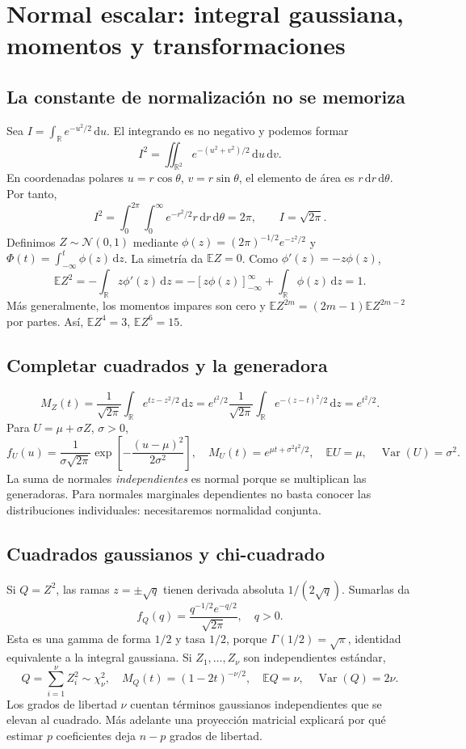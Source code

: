 \documentclass[11pt,a4paper]{article}
\newcommand{\R}{\mathbb R}
\newcommand{\E}{\mathbb E}
\newcommand{\dd}{\,\mathrm d}
\DeclareMathOperator{\Var}{Var}
\theoremstyle{definition}
\begin{document}
\section{Normal escalar: integral gaussiana, momentos y transformaciones}
\subsection{La constante de normalización no se memoriza}
Sea $I=\int_\R e^{-u^2/2}\dd u$. El integrando es no negativo y podemos formar
\[
I^2=\iint_{\R^2}e^{-(u^2+v^2)/2}\dd u\dd v.
\]
En coordenadas polares $u=r\cos\theta$, $v=r\sin\theta$, el elemento de área es $r\dd r\dd\theta$. Por tanto,
\[
I^2=\int_0^{2\pi}\int_0^\infty e^{-r^2/2}r\dd r\dd\theta=2\pi,
\qquad I=\sqrt{2\pi}.
\]
Definimos $Z\sim\mathcal N(0,1)$ mediante $\phi(z)=(2\pi)^{-1/2}e^{-z^2/2}$ y $\Phi(t)=\int_{-\infty}^t\phi(z)\dd z$. La simetría da $\E Z=0$. Como $\phi'(z)=-z\phi(z)$,
\[
\E Z^2=-\int_\R z\phi'(z)\dd z
=-[z\phi(z)]_{-\infty}^{\infty}+\int_\R\phi(z)\dd z=1.
\]
Más generalmente, los momentos impares son cero y $\E Z^{2m}=(2m-1)\E Z^{2m-2}$ por partes. Así, $\E Z^4=3$, $\E Z^6=15$.
\subsection{Completar cuadrados y la generadora}
\[
M_Z(t)=\frac1{\sqrt{2\pi}}\int_\R e^{tz-z^2/2}\dd z
=e^{t^2/2}\frac1{\sqrt{2\pi}}\int_\R e^{-(z-t)^2/2}\dd z=e^{t^2/2}.
\]
Para $U=\mu+\sigma Z$, $\sigma>0$,
\[
f_U(u)=\frac1{\sigma\sqrt{2\pi}}\exp\!\left[-\frac{(u-\mu)^2}{2\sigma^2}\right],
\quad M_U(t)=e^{\mu t+\sigma^2t^2/2},
\quad\E U=\mu,\quad\Var(U)=\sigma^2.
\]
La suma de normales \emph{independientes} es normal porque se multiplican las generadoras. Para normales marginales dependientes no basta conocer las distribuciones individuales: necesitaremos normalidad conjunta.
\subsection{Cuadrados gaussianos y chi-cuadrado}
Si $Q=Z^2$, las ramas $z=\pm\sqrt q$ tienen derivada absoluta $1/(2\sqrt q)$. Sumarlas da
\[
f_Q(q)=\frac{q^{-1/2}e^{-q/2}}{\sqrt{2\pi}},\quad q>0.
\]
Esta es una gamma de forma $1/2$ y tasa $1/2$, porque $\Gamma(1/2)=\sqrt\pi$, identidad equivalente a la integral gaussiana. Si $Z_1,\ldots,Z_\nu$ son independientes estándar,
\[
Q=\sum_{i=1}^\nu Z_i^2\sim\chi^2_\nu,\quad
M_Q(t)=(1-2t)^{-\nu/2},\quad
\E Q=\nu,\quad\Var(Q)=2\nu.
\]
Los grados de libertad $\nu$ cuentan términos gaussianos independientes que se elevan al cuadrado. Más adelante una proyección matricial explicará por qué estimar $p$ coeficientes deja $n-p$ grados de libertad.
\end{document}
